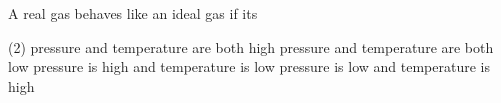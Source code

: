 
\item A real gas behaves like an ideal gas if its
    \begin{tasks}(2)
        \task pressure and temperature are both high
        \task pressure and temperature are both low
        \task pressure is high and temperature is low
        \task pressure is low and temperature is high\ans
    \end{tasks}
